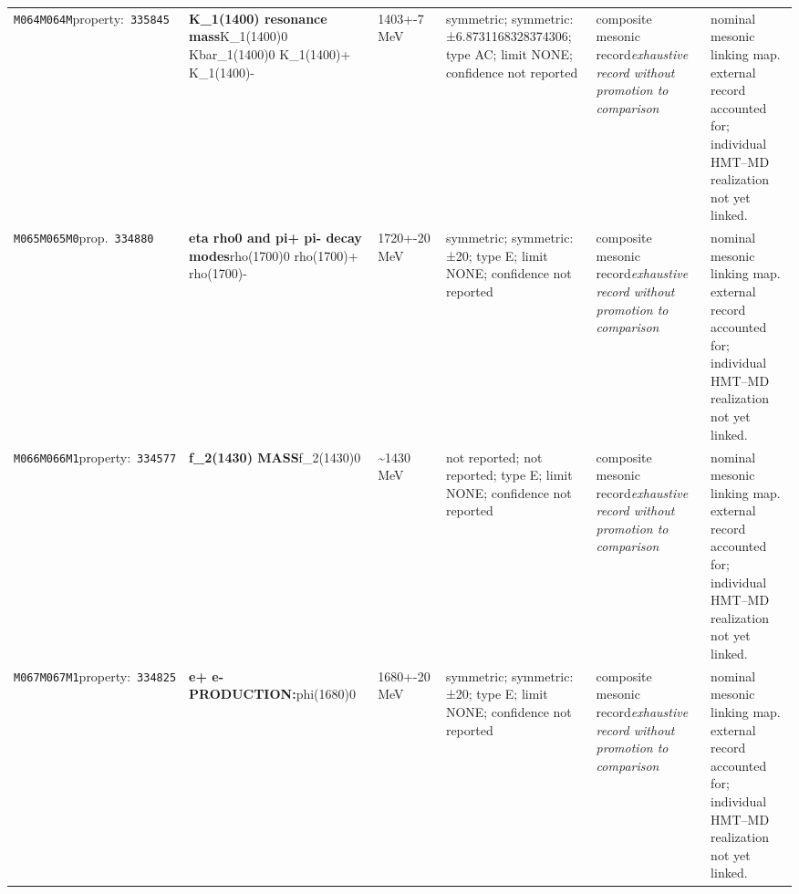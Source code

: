 \begin{landscape}
\begin{longtable}{L{1.85cm}L{4.45cm}L{2.35cm}L{4.05cm}L{3.35cm}L{7.15cm}}
\texttt{M064}\newline \texttt{M064M}\newline property:\ \texttt{335845} & \textbf{K\_\allowbreak{}1(1400) resonance mass}\newline K\_\allowbreak{}1(1400)0 \textbar{}\allowbreak{} Kbar\_\allowbreak{}1(1400)0 \textbar{}\allowbreak{} K\_\allowbreak{}1(1400)+ \textbar{}\allowbreak{} K\_\allowbreak{}1(1400)- & 1403+-7\,MeV & symmetric; symmetric: ±6.8731168328374306; type AC; limit NONE; confidence not reported & composite mesonic record\newline \emph{exhaustive record without promotion to comparison} & nominal mesonic linking map. external record accounted for; individual HMT--MD realization not yet linked. \\
\texttt{M065}\newline \texttt{M065M0}\newline prop.\ \texttt{334880} & \textbf{eta rho0 and pi+ pi- decay modes}\newline rho(1700)0 \textbar{}\allowbreak{} rho(1700)+ \textbar{}\allowbreak{} rho(1700)- & 1720+-20\,MeV & symmetric; symmetric: ±20; type E; limit NONE; confidence not reported & composite mesonic record\newline \emph{exhaustive record without promotion to comparison} & nominal mesonic linking map. external record accounted for; individual HMT--MD realization not yet linked. \\
\texttt{M066}\newline \texttt{M066M1}\newline property:\ \texttt{334577} & \textbf{f\_\allowbreak{}2(1430) MASS}\newline f\_\allowbreak{}2(1430)0 & \textasciitilde{}1430\,MeV & not reported; not reported; type E; limit NONE; confidence not reported & composite mesonic record\newline \emph{exhaustive record without promotion to comparison} & nominal mesonic linking map. external record accounted for; individual HMT--MD realization not yet linked. \\
\texttt{M067}\newline \texttt{M067M1}\newline property:\ \texttt{334825} & \textbf{e+ e- PRODUCTION:}\newline phi(1680)0 & 1680+-20\,MeV & symmetric; symmetric: ±20; type E; limit NONE; confidence not reported & composite mesonic record\newline \emph{exhaustive record without promotion to comparison} & nominal mesonic linking map. external record accounted for; individual HMT--MD realization not yet linked. \\

\end{longtable}
\end{landscape}
